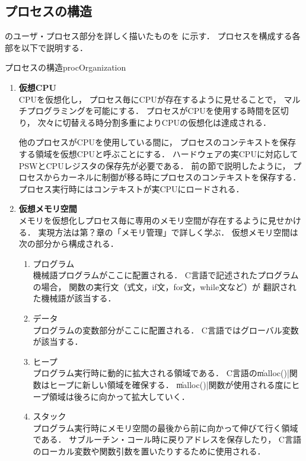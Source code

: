 \subsection{プロセスの構造}
のユーザ・プロセス部分を詳しく描いたものを
に示す．
プロセスを構成する各部を以下で説明する．

{プロセスの構造}{procOrganization}

\begin{enumerate}
\item {\bf 仮想CPU} \\
CPUを仮想化し，
プロセス毎にCPUが存在するように見せることで，
マルチプログラミングを可能にする．
プロセスがCPUを使用する時間を区切り，
次々に切替える時分割多重によりCPUの仮想化は達成される．

他のプロセスがCPUを使用している間に，
プロセスのコンテキストを保存する領域を仮想CPUと呼ぶことにする．
ハードウェアの実CPUに対応してPSWとCPUレジスタの保存先が必要である．
前の節で説明したように，
プロセスからカーネルに制御が移る時にプロセスのコンテキストを保存する．
プロセス実行時にはコンテキストが実CPUにロードされる．

\item {\bf 仮想メモリ空間} \\
メモリを仮想化しプロセス毎に専用のメモリ空間が存在するように見せかける．
実現方法は第？章の「メモリ管理」で詳しく学ぶ．
仮想メモリ空間は次の部分から構成される．

\begin{enumerate}
\item プログラム \\
機械語プログラムがここに配置される．
C言語で記述されたプログラムの場合，
関数の実行文（式文，if文，for文，while文など）が
翻訳された機械語が該当する．

\item データ \\
プログラムの変数部分がここに配置される．
C言語ではグローバル変数が該当する．

\item ヒープ \\
プログラム実行時に動的に拡大される領域である．
C言語の\|malloc()|関数はヒープに新しい領域を確保する．
\|malloc()|関数が使用される度にヒープ領域は後ろに向かって拡大していく．

\item スタック \\
プログラム実行時にメモリ空間の最後から前に向かって伸びて行く領域である．
サブルーチン・コール時に戻りアドレスを保存したり，
C言語のローカル変数や関数引数を置いたりするために使用される．


\end{enumerate}
\end{enumerate}
